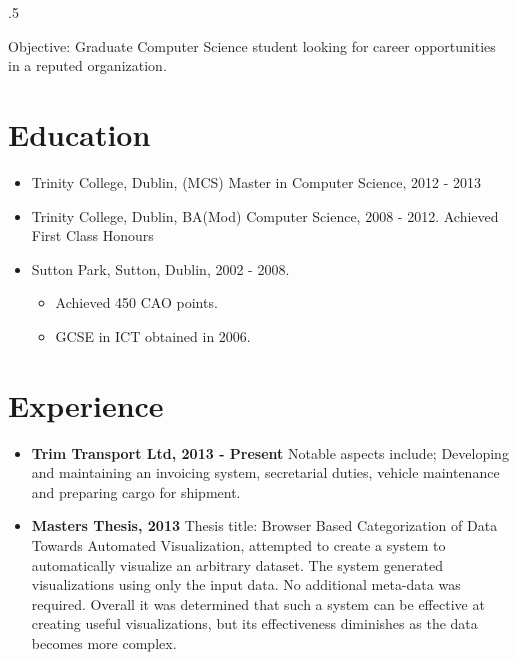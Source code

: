 \documentclass{res}
\begin{document}
 

\thispagestyle{empty} %
\pagestyle{empty}
\address{14 Strand Road\\
Sutton\\
Dublin 13\\
00 353 86 3807768\\
divines@tcd.ie}






\begin{resume}
\vspace{0.1in}
\moveleft.5\sectionwidth\centerline{Objective: Graduate Computer Science student looking for career opportunities in a reputed organization.}  


\section{Education}
\vspace{0.1in} 

  \begin{itemize}
    \item Trinity College, Dublin, (MCS) Master in Computer Science, 2012 - 2013
 
    \item Trinity College, Dublin, BA(Mod) Computer Science, 2008 - 2012. Achieved First Class Honours
 
    \item Sutton Park, Sutton, Dublin, 2002 - 2008.
      \begin{itemize}
        \item Achieved 450 CAO points.
        \item GCSE in ICT obtained in 2006.
      \end{itemize}
  \end{itemize}
    

\section{Experience} 
\vspace{0.1in}
  \begin{itemize}
    \item{\bf{Trim Transport Ltd, 2013 - Present}} Notable aspects include; Developing and maintaining an invoicing system, secretarial duties, vehicle maintenance and preparing cargo for shipment.

    \item{{\bf Masters Thesis, 2013}} Thesis title: Browser Based Categorization of Data Towards Automated Visualization, attempted to create a system to automatically visualize an arbitrary dataset. The system generated visualizations using only the input data. No additional meta-data was required. Overall it was determined that such a system can be effective at creating useful visualizations, but its effectiveness diminishes as the data becomes more complex.



\end{itemize}
\end{resume}
\end{document}

